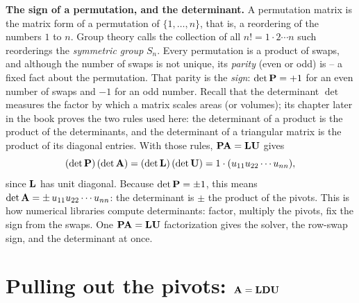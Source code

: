 \begin{connectionbox}
\textbf{The sign of a permutation, and the determinant.} A permutation matrix is the matrix
form of a permutation of $\{1,\dots,n\}$, that is, a reordering of the numbers $1$ to $n$.
Group theory calls the collection of all $n! = 1\cdot 2\cdots n$ such reorderings the
\emph{symmetric group} $S_n$. Every permutation is a product
of swaps, and although the number of swaps is not unique, its \emph{parity} (even or odd)
is -- a fixed fact about the permutation. That parity is the \emph{sign}: $\det\mathbf{P}=+1$
for an even number of swaps and $-1$ for an odd number. Recall that the determinant $\det$
measures the factor by which a matrix scales areas (or volumes); its chapter later in the
book proves the two rules used here: the determinant of a product is the product of the
determinants, and the determinant of a triangular matrix is the product of its diagonal
entries. With those rules, $\mathbf{P}\mathbf{A}=\mathbf{L}\mathbf{U}$ gives
\[
  (\det\mathbf{P})\,(\det\mathbf{A}) = (\det\mathbf{L})\,(\det\mathbf{U})
  = 1 \cdot (u_{11}u_{22}\cdots u_{nn}),
\]
since $\mathbf{L}$ has unit diagonal. Because $\det\mathbf{P} = \pm 1$, this means
$\det\mathbf{A} = \pm\, u_{11}u_{22}\cdots u_{nn}$: the determinant is $\pm$ the product of
the pivots. This is how numerical libraries compute determinants: factor, multiply the
pivots, fix the sign from the swaps. One $\mathbf{P}\mathbf{A}=\mathbf{L}\mathbf{U}$ factorization gives
the solver, the row-swap sign, and the determinant at once.
\end{connectionbox}

\section{Pulling out the pivots: \texorpdfstring{$\mathbf{A}=\mathbf{L}\mathbf{D}\mathbf{U}$}{A=LDU}}
\label{ch09:ldu}

